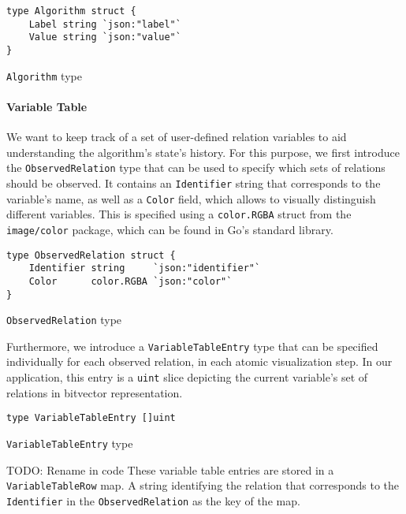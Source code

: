 \begin{code}
\begin{verbatim}   
type Algorithm struct {
    Label string `json:"label"`
    Value string `json:"value"`
}
\end{verbatim}
\caption{\texttt{Algorithm} type}
\end{code}
\vspace{0.8cm}

\paragraph{Variable Table}

We want to keep track of a set of user-defined relation variables to aid understanding the algorithm's state's history. For this purpose, we first introduce the \texttt{ObservedRelation} type that can be used to specify which sets of relations should be observed. It contains an \texttt{Identifier} string that corresponds to the variable's name, as well as a \texttt{Color} field, which allows to visually distinguish different variables. This is specified using a \texttt{color.RGBA} struct from the \texttt{image/color} package, which can be found in Go's standard library.

\begin{code}
\begin{verbatim}
type ObservedRelation struct {
    Identifier string     `json:"identifier"`
    Color      color.RGBA `json:"color"`
}
\end{verbatim}
\caption{\texttt{ObservedRelation} type}
\end{code}
\vspace{0.8cm}

Furthermore, we introduce a \texttt{VariableTableEntry} type that can be specified individually for each observed relation, in each atomic visualization step. In our application, this entry is a \texttt{uint} slice depicting the current variable's set of relations in bitvector representation.

\begin{code}
\begin{verbatim}
type VariableTableEntry []uint
\end{verbatim}
\caption{\texttt{VariableTableEntry} type}
\end{code}
\vspace{0.8cm}

TODO: Rename in code
These variable table entries are stored in a \texttt{VariableTableRow} map. A string identifying the relation that corresponds to the \texttt{Identifier} in the \texttt{ObservedRelation} as the key of the map.

